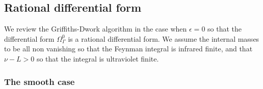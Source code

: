 \documentclass[a4paper,12pt]{article}
\newcommand\lNote[1]{
	\todo[backgroundcolor=red!20!white,fancyline,
	bordercolor=white]{ LDLC:  #1}}
\numberwithin{equation}{section}
\numberwithin{figure}{section}
\newcommand{\pvnote}[1]{\sethlcolor{bubblegum} \protect\hl{Pierre V.: #1} \sethlcolor{yellow}}
\begin{document}
\subsection{Rational differential form}
\label{sec:rati-diff-form}

We review the Griffiths-Dwork algorithm in the case  
when $\epsilon=0$ so that the differential form
$\Omega^0_\Gamma$ is a rational differential form. We assume the
internal masses to be all non vanishing so that the Feynman
integral is infrared finite, and that $\nu -L>0$ so that the integral
is ultraviolet finite.
\subsubsection{The smooth case}
\label{sec:smooth-case}
\end{document}
